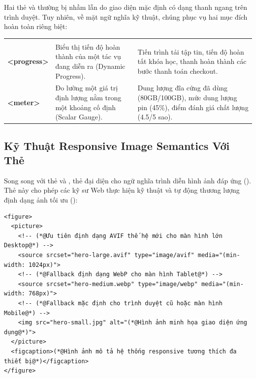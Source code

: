 Hai thẻ  và  thường bị nhầm lẫn do giao diện mặc định có dạng thanh ngang trên trình duyệt. Tuy nhiên, về mặt ngữ nghĩa kỹ thuật, chúng phục vụ hai mục đích hoàn toàn riêng biệt:

\begin{prettyTableBox}
\begin{tabularx}{\linewidth}{>{\ttfamily\bfseries\color{primaryBlue}}K{2.0cm} Z Z}
 &  &  \\

<progress> & Biểu thị tiến độ hoàn thành của một tác vụ đang diễn ra (Dynamic Progress). & Tiến trình tải tập tin, tiến độ hoàn tất khóa học, thanh hoàn thành các bước thanh toán checkout. \\

<meter> & Đo lường một giá trị định lượng nằm trong một khoảng cố định (Scalar Gauge). & Dung lượng đĩa cứng đã dùng (80GB/100GB), mức dung lượng pin (45\%), điểm đánh giá chất lượng (4.5/5 sao). \\
\end{tabularx}
\end{prettyTableBox}

\Needspace*{120pt}
\subsection{Kỹ Thuật Responsive Image Semantics Với Thẻ }

Song song với thẻ  và , thẻ  đại diện cho ngữ nghĩa trình diễn hình ảnh đáp ứng (). Thẻ này cho phép các kỹ sư Web thực hiện kỹ thuật  và tự động thương lượng định dạng ảnh tối ưu ():

\begin{codeWindow}
\begin{lstlisting}[language=HTML5]
<figure>
  <picture>
    <!-- (*@Ưu tiên định dạng AVIF thế hệ mới cho màn hình lớn Desktop@*) -->
    <source srcset="hero-large.avif" type="image/avif" media="(min-width: 1024px)">
    <!-- (*@Fallback định dạng WebP cho màn hình Tablet@*) -->
    <source srcset="hero-medium.webp" type="image/webp" media="(min-width: 768px)">
    <!-- (*@Fallback mặc định cho trình duyệt cũ hoặc màn hình Mobile@*) -->
    <img src="hero-small.jpg" alt="(*@Hình ảnh minh họa giao diện ứng dụng@*)">
  </picture>
  <figcaption>(*@Hình ảnh mô tả hệ thống responsive tương thích đa thiết bị@*)</figcaption>
</figure>
\end{lstlisting}
\end{codeWindow}

